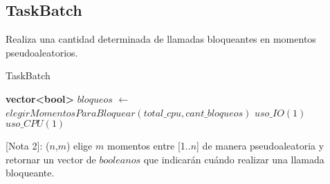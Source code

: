 \subsection{TaskBatch}

Realiza una cantidad determinada de llamadas bloqueantes en momentos pseudoaleatorios.

\begin{algorithm}
 \caption{TaskBatch}
 \begin{algorithmic}[1]
		\State \textbf{vector<bool>} $bloqueos$ $\gets$ $elegirMomentosParaBloquear(total\_cpu,cant\_bloqueos)$ \Comment{[Nota 2]}
				\State $uso\_IO(1)$
			\Else
				\State $uso\_CPU(1)$
			\EndIf
		\EndFor
	\EndProcedure
 \end{algorithmic}
\end{algorithm}

[Nota 2]: ($n$,$m$) elige $m$ momentos entre [1..$n$] de manera pseudoaleatoria y retornar un vector de $booleanos$ que indicar\'an cu\'ando realizar una llamada bloqueante. 